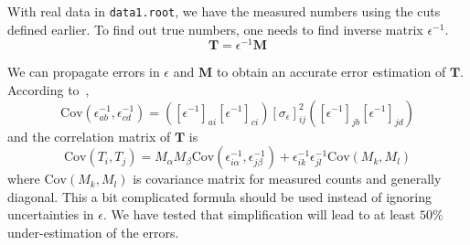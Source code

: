 With real data in \verb|data1.root|, we have the measured numbers using the cuts defined earlier. To find out true numbers, one needs to find inverse matrix $\epsilon^{-1}$.
\begin{equation}
	\mathbf{T} = \epsilon^{-1} \mathbf{M}
\end{equation}

We can propagate errors in $\epsilon$ and $\mathbf{M}$ to obtain an accurate error estimation of $\mathbf{T}$. According to~\cite{Lefebvre:400631},
\begin{equation}
	\text{Cov}(\epsilon^{-1}_{ab}, \epsilon^{-1}_{cd})= ([\epsilon^{-1}]_{a i} [\epsilon^{-1}]_{c i}) [\sigma_{\epsilon}]^2_{ij} ([\epsilon^{-1}]_{j b} [\epsilon^{-1}]_{j d})
\end{equation}
and the correlation matrix of $\mathbf{T}$ is
\begin{equation}
	\text{Cov}(T_i, T_j) = M_\alpha M_\beta \text{Cov} (\epsilon^{-1}_{i\alpha}, \epsilon^{-1}_{j\beta}) + \epsilon^{-1}_{ik} \epsilon^{-1}_{jl} \text{Cov}(M_k, M_l)
	\label{math:CovTT}
\end{equation}
where $\text{Cov}(M_k, M_l)$ is covariance matrix for measured counts and generally diagonal. This a bit complicated formula should be used instead of ignoring uncertainties in $\epsilon$. We have tested that simplification will lead to at least $50\%$ under-estimation of the errors.


